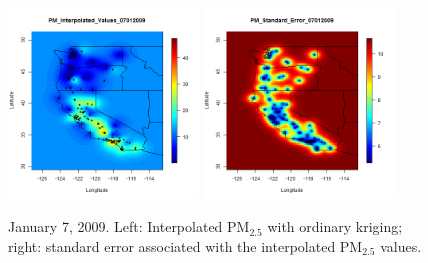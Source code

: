 \documentclass[10pt]{article}
\begin{document}
\begin{figure}[H]
\centering
  \includegraphics[width=0.45\textwidth]{Interpolated_PM2009_0007.png}
  \includegraphics[width=0.45\textwidth]{Standard_Error_PM2009_0007.png}
  \caption{January 7, 2009. Left: Interpolated PM$_{2.5}$ with ordinary kriging; right: 
standard error associated with the interpolated PM$_{2.5}$ values.}
\label{examplepm}
\end{figure}
\end{document}
